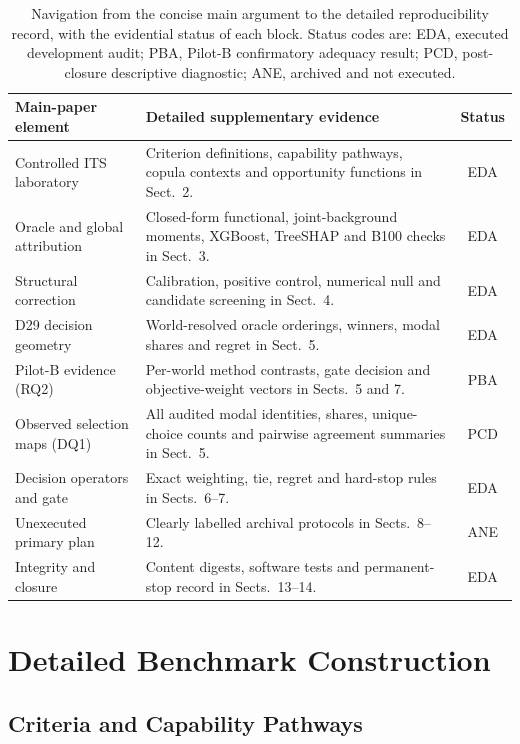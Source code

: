 \documentclass[runningheads,orivec]{llncs}
\newcommand{\XGB}{XGBoost}
\begin{document}
\begin{table}[t]
\centering
\caption{Navigation from the concise main argument to the detailed reproducibility record,
with the evidential status of each block. Status codes are: EDA, executed development audit;
PBA, Pilot-B confirmatory adequacy result; PCD, post-closure descriptive diagnostic; ANE,
archived and not executed.}
\label{supp:tab:readermap}
\small
\begin{tabularx}{\linewidth}{@{}lXc@{}}
\toprule
\textbf{Main-paper element} & \textbf{Detailed supplementary evidence} & \textbf{Status}\\
\midrule
Controlled ITS laboratory & Criterion definitions, capability pathways, copula contexts and
opportunity functions in Sect.~2. & EDA\\
Oracle and global attribution & Closed-form functional, joint-background moments, \XGB,
TreeSHAP and B100 checks in Sect.~3. & EDA\\
Structural correction & Calibration, positive control, numerical null and candidate screening
in Sect.~4. & EDA\\
D29 decision geometry & World-resolved oracle orderings, winners, modal shares and regret in
Sect.~5. & EDA\\
Pilot-B evidence (RQ2) & Per-world method contrasts, gate decision and objective-weight vectors
in Sects.~5 and 7. & PBA\\
Observed selection maps (DQ1) & All audited modal identities, shares, unique-choice counts and
pairwise agreement summaries in Sect.~5. & PCD\\
Decision operators and gate & Exact weighting, tie, regret and hard-stop rules in Sects.~6--7.
& EDA\\
Unexecuted primary plan & Clearly labelled archival protocols in Sects.~8--12. & ANE\\
Integrity and closure & Content digests, software tests and permanent-stop record in
Sects.~13--14. & EDA\\
\bottomrule
\end{tabularx}
\end{table}

\section{Detailed Benchmark Construction}

\subsection{Criteria and Capability Pathways}
\end{document}
